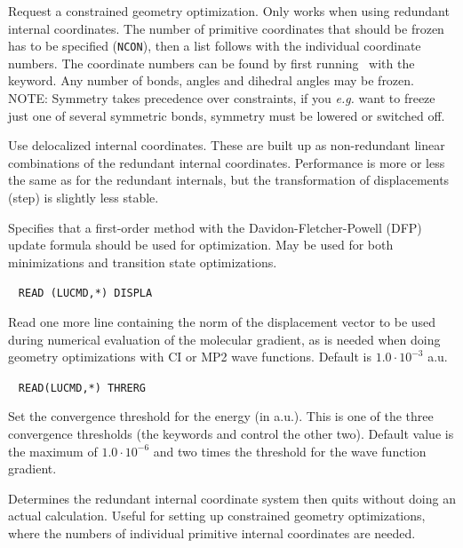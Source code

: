 \begin{description}
Request a constrained geometry optimization. Only works when using
redundant internal coordinates. The number of primitive coordinates
that should be frozen has to be specified (\verb|NCON|), then a list
follows with the individual coordinate numbers. The coordinate numbers
can be found by first running \dalton\ with the 
keyword. Any number of bonds, angles and dihedral angles may be
frozen. NOTE: Symmetry takes precedence over constraints, if you
{\it e.g.\/} want to freeze just one of several symmetric bonds, symmetry
must be lowered or switched off.

\item[\Key{DELINT}]
Use delocalized internal coordinates.
These are built up as
non-redundant linear combinations of the redundant internal
coordinates. Performance is more or less the same as for the redundant
internals, but the transformation of displacements (step) is slightly
less stable.

\item[\Key{DFP}]
Specifies that a first-order method with the
Davidon-Fletcher-Powell (DFP) update
formula should be used for optimization. May be used for both
minimizations and transition state optimizations.

\item[\Key{DISPLA}]\verb| |\newline
\verb|READ (LUCMD,*) DISPLA|

Read one more line containing the norm of the displacement vector to
be used during numerical evaluation of the molecular gradient, as is
needed when doing geometry optimizations with CI or MP2 wave
functions. Default is $1.0\cdot 10^{-3}$ a.u.

\item[\Key{ENERGY}]\verb| |
\newline
\verb|READ(LUCMD,*) THRERG|

Set the convergence threshold for the energy (in a.u.). This is one of the three
convergence thresholds (the keywords
 and 
control the other two). Default value is the maximum of $1.0\cdot
10^{-6}$ and two times the threshold for the wave function gradient.

\item[\Key{FINDRE}]
Determines the redundant internal coordinate system then quits without
doing an actual calculation. Useful for setting up constrained
geometry optimizations, where the numbers of individual primitive
internal coordinates are needed.


\end{description}
